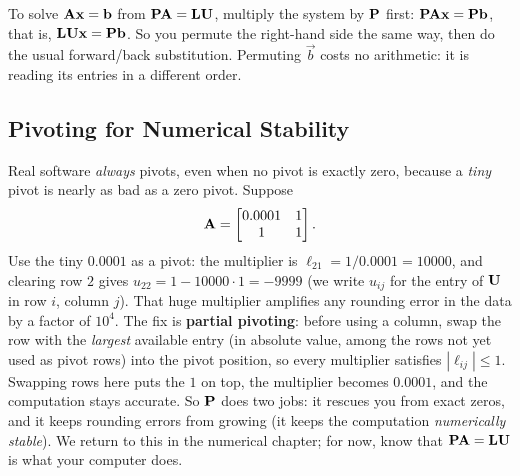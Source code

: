 To solve $\mathbf{A}\mathbf{x}=\mathbf{b}$ from $\mathbf{P}\mathbf{A}=\mathbf{L}\mathbf{U}$, multiply the system
by $\mathbf{P}$ first: $\mathbf{P}\mathbf{A}\mathbf{x}=\mathbf{P}\mathbf{b}$, that is,
$\mathbf{L}\mathbf{U}\mathbf{x}=\mathbf{P}\mathbf{b}$. So you permute the right-hand side the same way, then
do the usual forward/back substitution. Permuting $\vec{b}$ costs no arithmetic: it is
reading its entries in a different order.

\subsection{Pivoting for Numerical Stability}
\label{ch09:pivot-stability}

Real software \emph{always} pivots, even when no pivot is exactly
zero, because a \emph{tiny} pivot is nearly as bad as a zero pivot. Suppose
\[
  \mathbf{A} = \begin{bmatrix} 0.0001 & 1 \\ 1 & 1 \end{bmatrix}.
\]
Use the tiny $0.0001$ as a pivot: the multiplier is $\ell_{21}=1/0.0001 = 10000$, and
clearing row $2$ gives $u_{22} = 1 - 10000\cdot 1 = -9999$ (we write $u_{ij}$ for the entry of
$\mathbf{U}$ in row $i$, column $j$). That huge multiplier amplifies
any rounding error in the data by a factor of $10^4$. The fix is \textbf{partial pivoting}:
before using a column, swap the row with the \emph{largest} available entry (in absolute
value, among the rows not yet used as pivot rows) into the pivot
position, so every multiplier satisfies $|\ell_{ij}|\le 1$. Swapping rows here puts the $1$
on top, the multiplier becomes $0.0001$, and the computation stays accurate. So
$\mathbf{P}$ does two jobs: it rescues you from exact zeros, and it keeps rounding errors from
growing (it keeps the computation \emph{numerically stable}). We return to this in the
numerical chapter; for now, know that $\mathbf{P}\mathbf{A}=\mathbf{L}\mathbf{U}$ is what your computer
does.

